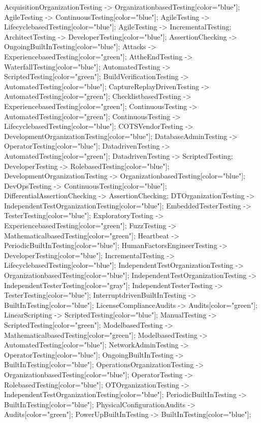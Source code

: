 \documentclass{article}
\begin{document}
{AcquisitionOrganizationTesting -> OrganizationbasedTesting[color="blue"];
AgileTesting -> ContinuousTesting[color="blue"];
AgileTesting -> LifecyclebasedTesting[color="blue"];
AgileTesting -> IncrementalTesting;
ArchitectTesting -> DeveloperTesting[color="blue"];
AssertionChecking -> OngoingBuiltInTesting[color="blue"];
Attacks -> ExperiencebasedTesting[color="green"];
AttheEndTesting -> WaterfallTesting[color="blue"];
AutomatedTesting -> ScriptedTesting[color="green"];
BuildVerificationTesting -> AutomatedTesting[color="blue"];
CaptureReplayDrivenTesting -> AutomatedTesting[color="green"];
ChecklistbasedTesting -> ExperiencebasedTesting[color="green"];
ContinuousTesting -> AutomatedTesting[color="green"];
ContinuousTesting -> LifecyclebasedTesting[color="blue"];
COTSVendorTesting -> DevelopmentOrganizationTesting[color="blue"];
DatabaseAdminTesting -> OperatorTesting[color="blue"];
DatadrivenTesting -> AutomatedTesting[color="green"];
DatadrivenTesting -> ScriptedTesting;
DeveloperTesting -> RolebasedTesting[color="blue"];
DevelopmentOrganizationTesting -> OrganizationbasedTesting[color="blue"];
DevOpsTesting -> ContinuousTesting[color="blue"];
DifferentialAssertionChecking -> AssertionChecking;
DTOrganizationTesting -> IndependentTestOrganizationTesting[color="blue"];
EmbeddedTesterTesting -> TesterTesting[color="blue"];
ExploratoryTesting -> ExperiencebasedTesting[color="green"];
FuzzTesting -> MathematicalbasedTesting[color="green"];
Heartbeat -> PeriodicBuiltInTesting[color="blue"];
HumanFactorsEngineerTesting -> DeveloperTesting[color="blue"];
IncrementalTesting -> LifecyclebasedTesting[color="blue"];
IndependentTestOrganizationTesting -> OrganizationbasedTesting[color="blue"];
IndependentTestOrganizationTesting -> IndependentTesterTesting[color="gray"];
IndependentTesterTesting -> TesterTesting[color="blue"];
InterruptdrivenBuiltInTesting -> BuiltInTesting[color="blue"];
LicenseComplianceAudits -> Audits[color="green"];
LinearScripting -> ScriptedTesting[color="blue"];
ManualTesting -> ScriptedTesting[color="green"];
ModelbasedTesting -> MathematicalbasedTesting[color="green"];
ModelbasedTesting -> AutomatedTesting[color="blue"];
NetworkAdminTesting -> OperatorTesting[color="blue"];
OngoingBuiltInTesting -> BuiltInTesting[color="blue"];
OperationsOrganizationTesting -> OrganizationbasedTesting[color="blue"];
OperatorTesting -> RolebasedTesting[color="blue"];
OTOrganizationTesting -> IndependentTestOrganizationTesting[color="blue"];
PeriodicBuiltInTesting -> BuiltInTesting[color="blue"];
PhysicalConfigurationAudits -> Audits[color="green"];
PowerUpBuiltInTesting -> BuiltInTesting[color="blue"];
}
\end{document}
